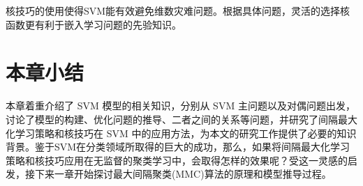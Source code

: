 核技巧的使用使得SVM能有效避免维数灾难问题。根据具体问题，灵活的选择核函数更有利于嵌入学习问题的先验知识。

\section{本章小结}
本章着重介绍了 SVM 模型的相关知识，分别从 SVM 主问题以及对偶问题出发，讨论了模型的构建、优化问题的推导、二者之间的关系等问题，并研究了间隔最大化学习策略和核技巧在 SVM 中的应用方法，为本文的研究工作提供了必要的知识背景。鉴于SVM在分类领域所取得的巨大的成功，那么，如果将间隔最大化学习策略和核技巧应用在无监督的聚类学习中，会取得怎样的效果呢{\fangsong ？}受这一灵感的启发，接下来一章开始探讨最大间隔聚类(MMC)算法的原理和模型推导过程。